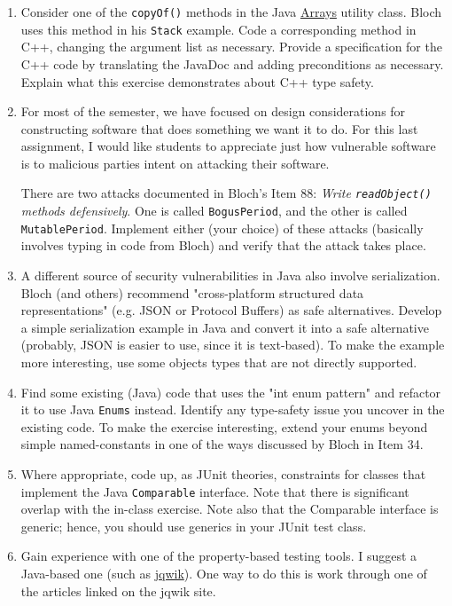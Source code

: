 \documentclass[11pt]{article}
\begin{document}
\begin{enumerate}
\item Consider one of the \texttt{copyOf()} methods in the Java \href{https://docs.oracle.com/javase/7/docs/api/java/util/Arrays.html}{Arrays} utility class. Bloch uses this method in his \texttt{Stack} example. Code a corresponding method in C++, changing the argument list as necessary. Provide a specification for the C++ code by translating the JavaDoc and adding preconditions as necessary. Explain what this exercise demonstrates about C++ type safety.

\item For most of the semester, we have focused on design considerations for constructing software that does something we want it to do. For this last assignment, I would like students to appreciate just how vulnerable software is to malicious parties intent on attacking their software.

There are two attacks documented in Bloch's Item 88: \emph{Write \texttt{readObject()} methods defensively}. One is called \texttt{BogusPeriod}, and the other is called \texttt{MutablePeriod}. Implement either (your choice) of these attacks (basically involves typing in code from Bloch) and verify that the attack takes place.

\item A different source of security vulnerabilities in Java also involve serialization. Bloch (and others) recommend "cross-platform structured data representations" (e.g. JSON or Protocol Buffers) as safe alternatives. Develop a simple serialization example in Java and convert it into a safe alternative (probably, JSON is easier to use, since it is text-based). To make the example more interesting, use some objects types that are not directly supported.

\item Find some existing (Java) code that uses the "int enum pattern" and refactor it to use Java \texttt{Enums} instead. Identify any type-safety issue you uncover in the existing code. To make the exercise interesting, extend your enums beyond simple named-constants in one of the ways discussed by Bloch in Item 34.

\item Where appropriate, code up, as JUnit theories, constraints for classes that implement the Java \texttt{Comparable} interface. Note that there is significant overlap with the in-class exercise. Note also that the Comparable interface is generic; hence, you should use generics in your JUnit test class.

\item Gain experience with one of the property-based testing tools. I suggest a Java-based one (such as \href{https://jqwik.net}{jqwik}). One way to do this is work through one of the articles linked on the jqwik site.
\end{enumerate}
\end{document}
